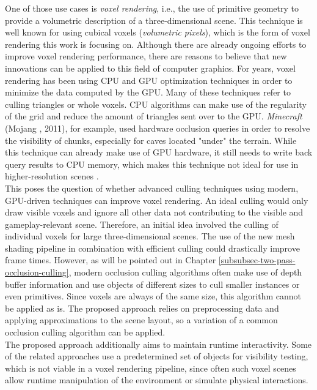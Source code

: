 \noindent
One of those use cases is \emph{voxel rendering}, i.e., the use of primitive geometry to provide a 
volumetric description of a three-dimensional scene. This technique is well known for using 
cubical voxels (\emph{volumetric pixels}), which is the form of voxel rendering this work is 
focusing on. Although there are already ongoing efforts to improve voxel rendering performance, there are 
reasons to believe that new innovations can be applied to this field of computer graphics. For years, 
voxel rendering has been using \ac{CPU} and \ac{GPU} optimization techniques in order to minimize 
the data computed by the \ac{GPU}. Many of these techniques refer to culling triangles or whole voxels. 
\ac{CPU} algorithms can make use of the regularity of the grid and reduce the amount of triangles sent 
over to the \ac{GPU}. \emph{Minecraft} (Mojang \cite{Mojang2024}, 2011), for example, used hardware 
occlusion queries in order to resolve the visibility of chunks, especially for caves located "under" the 
terrain. While this technique can already make use of \ac{GPU} hardware, it still needs to write back 
query results to \ac{CPU} memory, which makes this technique not ideal for use in higher-resolution 
scenes \cite{TommosBlog2014}. \\

\noindent
This poses the question of whether advanced culling techniques using modern, \ac{GPU}-driven techniques can 
improve voxel rendering. An ideal culling would only draw visible voxels and ignore all other data 
not contributing to the visible and gameplay-relevant scene. Therefore, an initial idea involved 
the culling of individual voxels for large three-dimensional scenes. The use of the new mesh shading 
pipeline in combination with efficient culling could drastically improve frame times. However, as will be 
pointed out in Chapter \ref{subsubsec-two-pass-occlusion-culling}, modern occlusion culling algorithms 
often make use of depth buffer information and use objects of different sizes to cull smaller instances 
or even primitives. Since voxels are always of the same size, this algorithm cannot be applied as is. 
The proposed approach relies on preprocessing data and applying approximations to the scene layout, 
so a variation of a common occlusion culling algorithm can be applied. \\

\noindent
The proposed approach additionally aims to maintain runtime interactivity. Some of the related approaches 
use a predetermined set of objects for visibility testing, which is not viable in a voxel rendering pipeline, 
since often such voxel scenes allow runtime manipulation of the environment or simulate physical interactions. \\

